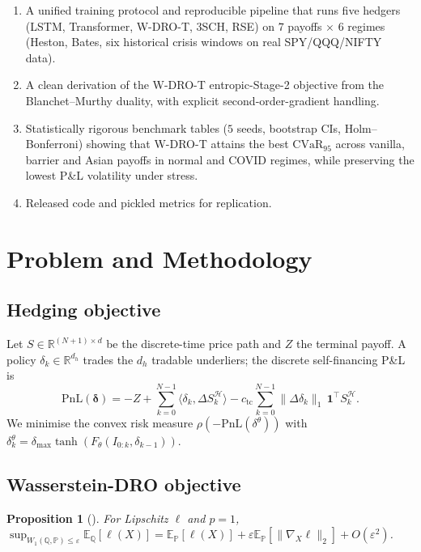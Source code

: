 \documentclass[10pt,twocolumn]{article}
\newcommand{\R}{\mathbb{R}}
\newcommand{\E}{\mathbb{E}}
\newcommand{\PP}{\mathbb{P}}
\newcommand{\QQ}{\mathbb{Q}}
\newcommand{\cvar}{\mathrm{CVaR}}
\newtheorem{proposition}{Proposition}
\begin{document}
\begin{enumerate}[leftmargin=*]
\item A unified training protocol and reproducible pipeline that runs
  five hedgers (LSTM, Transformer, W-DRO-T, 3SCH, RSE) on $7$ payoffs
  $\times$ $6$ regimes (Heston, Bates, six historical crisis windows on real
  SPY/QQQ/NIFTY data).
\item A clean derivation of the W-DRO-T entropic-Stage-2 objective from the
  Blanchet--Murthy duality, with explicit second-order-gradient handling.
\item Statistically rigorous benchmark tables ($5$ seeds, bootstrap CIs,
  Holm--Bonferroni) showing that W-DRO-T attains the best $\cvar_{95}$
  across vanilla, barrier and Asian payoffs in normal and COVID regimes,
  while preserving the lowest P\&L volatility under stress.
\item Released code and pickled metrics for replication.
\end{enumerate}

\section{Problem and Methodology}
\label{sec:method}

\subsection{Hedging objective}

Let $S\in\R^{(N+1)\times d}$ be the discrete-time price path and $Z$ the
terminal payoff.  A policy $\delta_k\in\R^{d_h}$ trades the $d_h$ tradable
underliers; the discrete self-financing P\&L is
\begin{equation}
\mathrm{PnL}(\boldsymbol\delta) = -Z + \sum_{k=0}^{N-1}\langle\delta_k,
\Delta S_k^{\mathcal H}\rangle - c_{\mathrm{tc}}\sum_{k=0}^{N-1}\|\Delta\delta_k\|_1
\,\mathbf 1^\top S_k^{\mathcal H}.
\end{equation}
We minimise the convex risk measure $\rho(-\mathrm{PnL}(\delta^\theta))$ with
$\delta^\theta_k=\delta_{\max}\tanh(F_\theta(I_{0:k},\delta_{k-1}))$.

\subsection{Wasserstein-DRO objective}

\begin{proposition}[\citealp{blanchet2019quantifying}]
For Lipschitz $\ell$ and $p=1$,
$\sup_{W_1(\QQ,\PP)\le\varepsilon}\E_\QQ[\ell(X)] = \E_\PP[\ell(X)] +
\varepsilon\E_\PP[\|\nabla_X\ell\|_2] + O(\varepsilon^2)$.
\end{proposition}
\end{document}
